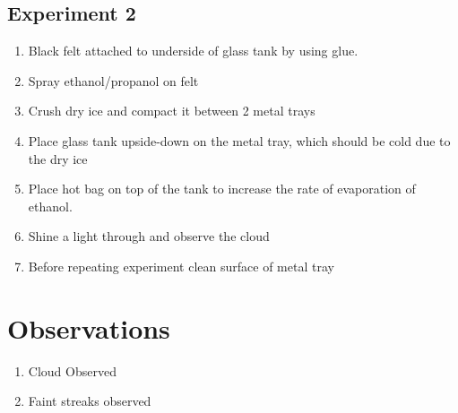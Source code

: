 \documentclass{article}
\begin{document}
\begin{center}
\section*{Experiment 2}
\end{center}
\large{\begin{enumerate}
    \item Black felt attached to underside of glass tank by using glue.
    \item Spray ethanol/propanol on felt
    \item Crush dry ice and compact it between 2 metal trays
    \item Place glass tank upside-down on the metal tray, which should be cold due to the dry ice
    \item Place hot bag on top of the tank to increase the rate of evaporation of ethanol.
    \item Shine a light through and observe the cloud
    \item Before repeating experiment clean surface of metal tray
\end{enumerate}}

\section*{Observations}
\large{\begin{enumerate}
  \item Cloud Observed
  \item Faint streaks observed
\end{enumerate}}
\end{document}
